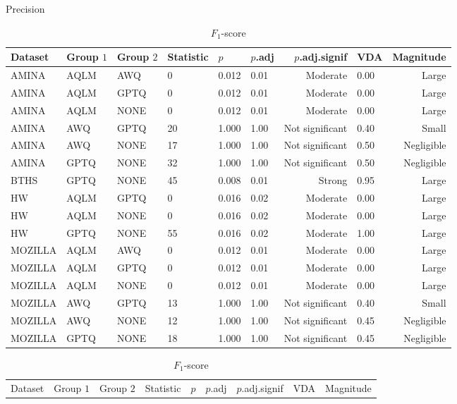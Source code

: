 \begin{table}[ht]
\begin{subtable}[t]{0.47\textwidth}
    \centering
    \caption{Precision}
    \begin{tabular}{llllllrlr}
    \toprule
    Dataset & Group $1$ & Group $2$ & Statistic & $p$ & $p$.adj & $p$.adj.signif & VDA & Magnitude \\
    \midrule
    AMINA & AQLM & AWQ & 0 & 0.012 & 0.01 & Moderate & 0.00 & Large \\
    AMINA & AQLM & GPTQ & 0 & 0.012 & 0.01 & Moderate & 0.00 & Large \\
    AMINA & AQLM & NONE & 0 & 0.012 & 0.01 & Moderate & 0.00 & Large \\
    AMINA & AWQ & GPTQ & 20 & 1.000 & 1.00 & Not significant & 0.40 & Small \\
    AMINA & AWQ & NONE & 17 & 1.000 & 1.00 & Not significant & 0.50 & Negligible \\
    AMINA & GPTQ & NONE & 32 & 1.000 & 1.00 & Not significant & 0.50 & Negligible \\
    BTHS & GPTQ & NONE & 45 & 0.008 & 0.01 & Strong & 0.95 & Large \\
    HW & AQLM & GPTQ & 0 & 0.016 & 0.02 & Moderate & 0.00 & Large \\
    HW & AQLM & NONE & 0 & 0.016 & 0.02 & Moderate & 0.00 & Large \\
    HW & GPTQ & NONE & 55 & 0.016 & 0.02 & Moderate & 1.00 & Large \\
    MOZILLA & AQLM & AWQ & 0 & 0.012 & 0.01 & Moderate & 0.00 & Large \\
    MOZILLA & AQLM & GPTQ & 0 & 0.012 & 0.01 & Moderate & 0.00 & Large \\
    MOZILLA & AQLM & NONE & 0 & 0.012 & 0.01 & Moderate & 0.00 & Large \\
    MOZILLA & AWQ & GPTQ & 13 & 1.000 & 1.00 & Not significant & 0.40 & Small \\
    MOZILLA & AWQ & NONE & 12 & 1.000 & 1.00 & Not significant & 0.45 & Negligible \\
    MOZILLA & GPTQ & NONE & 18 & 1.000 & 1.00 & Not significant & 0.45 & Negligible \\
    \bottomrule
    \end{tabular}
\end{subtable}
\hfill
\begin{subtable}[t]{0.47\textwidth}
    \centering
    \caption{$F_1$-score}
    \begin{tabular}{llllllrlr}
    \toprule
    Dataset & Group $1$ & Group $2$ & Statistic & $p$ & $p$.adj & $p$.adj.signif & VDA & Magnitude \\

\end{tabular}
\end{subtable}
\end{table}

